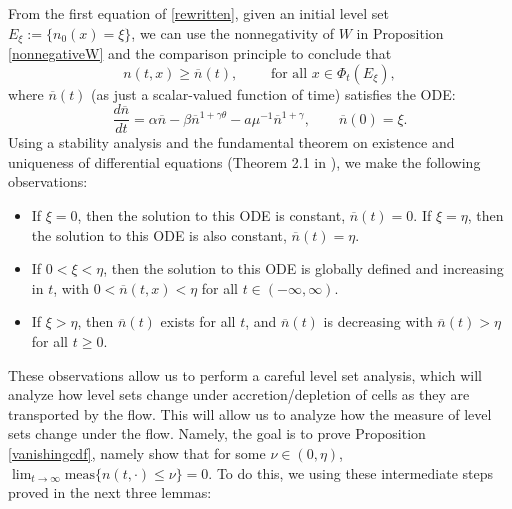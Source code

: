 \documentclass[12pt]{article}
\theoremstyle{plain}
\begin{document}
From the first equation of \eqref{rewritten}, given an initial level set $E_{\xi} := \{n_{0}(x) = \xi\}$, we can use the nonnegativity of $W$ in Proposition \ref{nonnegativeW} and the comparison principle to conclude that 
\begin{equation}\label{ncomparison}
n(t, x) \ge \overline{n}(t), \qquad \text{ for all } x \in \Phi_{t}(E_{\xi}),
\end{equation}
where $\overline{n}(t)$ (as just a scalar-valued function of time) satisfies the ODE:
\begin{equation}\label{nbarode}
\frac{d\overline{n}}{dt} = \alpha \overline{n} - \beta \overline{n}^{1 + \gamma \theta} - a\mu^{-1}\overline{n}^{1 + \gamma}, \qquad \overline{n}(0) = \xi.
\end{equation}
Using a stability analysis and the fundamental theorem on existence and uniqueness of differential equations (Theorem 2.1 in \cite{TaylorPDE}), we make the following observations:
\begin{itemize}
    \item If $\xi = 0$, then the solution to this ODE is constant, $\overline{n}(t) = 0$. If $\xi = \eta$, then the solution to this ODE is also constant, $\overline{n}(t) = \eta$.
    \item If $0 < \xi < \eta$, then the solution to this ODE is globally defined and increasing in $t$, with $0 < \overline{n}(t, x) < \eta$ for all $t \in (-\infty, \infty)$.
    \item If $\xi > \eta$, then $\overline{n}(t)$ exists for all $t$, and $\overline{n}(t)$ is decreasing with $\overline{n}(t) > \eta$ for all $t \ge 0$.
\end{itemize}
These observations allow us to perform a careful level set analysis, which will  analyze how level sets change under accretion/depletion of cells as they are transported by the flow. This will allow us to analyze how the measure of level sets change under the flow. Namely, the goal is to prove Proposition \ref{vanishingcdf}, namely show that for some $\nu \in (0, \eta)$, $\lim_{t \to \infty} \text{meas}\{n(t, \cdot) \le \nu\} = 0$. To do this, we using these intermediate steps proved in the next three lemmas:
\end{document}
